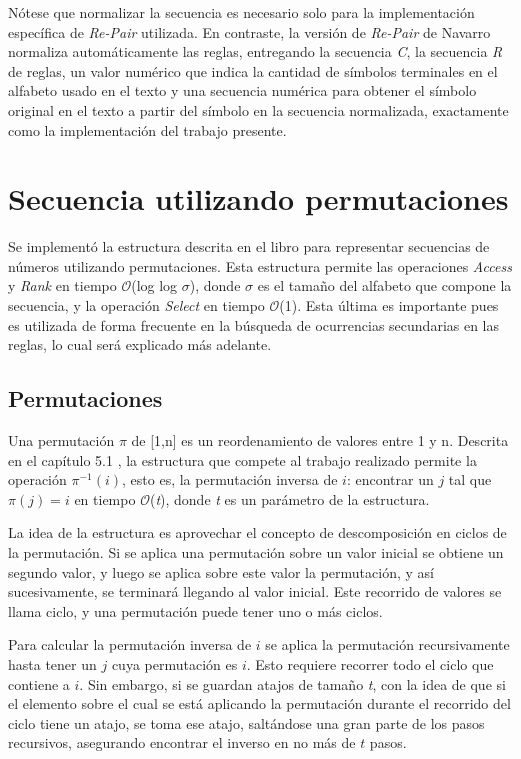 Nótese que normalizar la secuencia es necesario solo para la implementación específica de \textit{Re-Pair} utilizada. En contraste, la versión de \textit{Re-Pair} de Navarro\cite{re-pair-navarro} normaliza automáticamente las reglas, entregando la secuencia \textit{C}, la secuencia \textit{R} de reglas, un valor numérico que indica la cantidad de símbolos terminales en el alfabeto usado en el texto y una secuencia numérica para obtener el símbolo original en el texto a partir del símbolo en la secuencia normalizada, exactamente como la implementación del trabajo presente.

\section{Secuencia utilizando permutaciones}

Se implementó la estructura descrita en el libro \cite[Capítulo~6.1]{Navarro} para representar secuencias de números utilizando permutaciones. Esta estructura permite las operaciones \textit{Access} y \textit{Rank} en tiempo $\mathcal{O}$(log log $\sigma$), donde $\sigma$ es el tamaño del alfabeto que compone la secuencia, y la operación \textit{Select} en tiempo $\mathcal{O}$(1). Esta última es importante pues es utilizada de forma frecuente en la búsqueda de ocurrencias secundarias en las reglas, lo cual será explicado más adelante.

\subsection{Permutaciones}

Una permutación $\pi$ de [1,n] es un reordenamiento de valores entre 1 y n. Descrita en el capítulo 5.1 \cite{Navarro}, la estructura que compete al trabajo realizado permite la operación $\pi^{-1}(i)$, esto es, la permutación inversa de $i$: encontrar un $j$ tal que $\pi(j) = i$ en tiempo $\mathcal{O}$(\textit{t}), donde \textit{t} es un parámetro de la estructura.

La idea de la estructura es aprovechar el concepto de descomposición en ciclos de la permutación. Si se aplica una permutación sobre un valor inicial se obtiene un segundo valor, y luego se aplica sobre este valor la permutación, y así sucesivamente, se terminará llegando al valor inicial. Este recorrido de valores se llama ciclo, y una permutación puede tener uno o más ciclos. 

Para calcular la permutación inversa de $i$ se aplica la permutación recursivamente hasta tener un $j$ cuya permutación es $i$. Esto requiere recorrer todo el ciclo que contiene a $i$. Sin embargo, si se guardan atajos de tamaño \textit{t}, con la idea de que si el elemento sobre el cual se está aplicando la permutación durante el recorrido del ciclo tiene un atajo, se toma ese atajo, saltándose una gran parte de los pasos recursivos, asegurando encontrar el inverso en no más de $t$ pasos.

